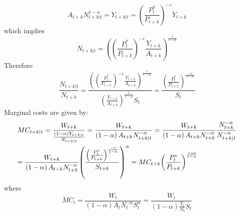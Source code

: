 \documentclass[12pt,a4paper]{article}
\begin{document}
\begin{equation}{A_{t + k}}N_{t + k|t}^{1 - \alpha } = {Y_{t + k|t}} = {\left( {\frac{{P_t^*}}{{{P_{t + k}}}}} \right)^{ - \varepsilon }}{Y_{t + k}}\end{equation}
which implies
\begin{equation}
{N_{t + k|t}} = {\left( {{{\left( {\frac{{P_t^*}}{{{P_{t + k}}}}} \right)}^{ - \varepsilon }}\frac{{{Y_{t + k}}}}{{{A_{t + k}}}}} \right)^{\frac{1}{{1 - \alpha }}}}
\end{equation}
Therefore
\begin{equation}\frac{{{N_{t + k|t}}}}{{{N_{t + k}}}} = \frac{{{{\left( {{{\left( {\frac{{P_t^*}}{{{P_{t + k}}}}} \right)}^{ - \varepsilon }}\frac{{{Y_{t + k}}}}{{{A_{t + k}}}}} \right)}^{\frac{1}{{1 - \alpha }}}}}}{{{{\left( {\frac{{{Y_{t + k}}}}{{{A_{t + k}}}}} \right)}^{\frac{1}{{1 - \alpha }}}}{S_t}}} = \frac{{{{\left( {\frac{{P_t^*}}{{{P_{t + k}}}}} \right)}^{\frac{{ - \varepsilon }}{{1 - \alpha }}}}}}{{{S_t}}}\end{equation}
Marginal costs are given by:
\[\begin{gathered}
  M{C_{t + k|t}} = \frac{{{W_{t + k}}}}{{\frac{{\left( {1 - \alpha } \right){Y_{t + k|t}}}}{{{N_{t + k|t}}}}}} = \frac{{{W_{t + k}}}}{{\left( {1 - \alpha } \right){A_{t + k}}N_{t + k|t}^{ - \alpha }}} = \frac{{{W_{t + k}}}}{{\left( {1 - \alpha } \right){A_{t + k}}N_{t + k}^{ - \alpha }}}\frac{{N_{t + k}^{ - \alpha }}}{{N_{t + k|t}^{ - \alpha }}} \hfill \\
   = \frac{{{W_{t + k}}}}{{\left( {1 - \alpha } \right){A_{t + k}}N_{t + k}^{ - \alpha }}}{\left( {\frac{{{{\left( {\frac{{P_t^*}}{{{P_{t + k}}}}} \right)}^{\frac{{ - \varepsilon }}{{1 - \alpha }}}}}}{{{S_{t + k}}}}} \right)^\alpha } = M{C_{t + k}}{\left( {\frac{{P_t^*}}{{{P_{t + k}}}}} \right)^{\frac{{ - \alpha \varepsilon }}{{1 - \alpha }}}} \hfill \\
\end{gathered} \]
where
\[
M{C_t} = \frac{{{W_t}}}{{\left( {1 - \alpha } \right){A_t}N_t^{ - \alpha }S_t^\alpha }} = \frac{{{W_{t}}}}{{\left( {1 - \alpha } \right)\frac{{{Y_t}}}{{{N_t}}}{S_t}}}
\]
\end{document}
